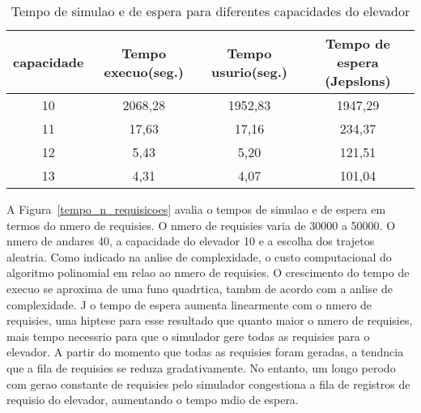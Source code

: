 \documentclass[12pt]{article}
\begin{document}
\begin{table}[ht!]
\centering
\begin{footnotesize}
\begin{tabular}{|c|c|c|c|}
\hline
\textbf{capacidade}              		& \textbf{Tempo execuo(seg.)} & \textbf{Tempo usurio(seg.)}      & \textbf{Tempo de espera (Jepslons)}\\ \hline
10	& 2068,28	& 1952,83	& 1947,29\\ \hline
11	& 17,63		& 17,16		& 234,37\\ \hline
12	& 5,43		& 5,20		& 121,51\\ \hline
13	& 4,31		& 4,07		& 101,04\\ \hline
\end{tabular}
\end{footnotesize}
\caption{Tempo de simulao e de espera para diferentes capacidades do elevador \label{tempo_capacidade_elevador}}
\end{table}

A Figura~\ref{tempo_n_requisicoes} avalia o tempos de simulao e de espera em termos do nmero de requisies. O nmero de requisies varia de 30000 a 50000. O nmero de andares  40, a capacidade do elevador  10 e a escolha dos trajetos  aleatria. Como indicado na anlise de complexidade, o custo computacional do algoritmo  polinomial em relao ao nmero de requisies. O crescimento do tempo de execuo se aproxima de uma funo quadrtica, tambm de acordo com a anlise de complexidade. J o tempo de espera aumenta linearmente com o nmero de requisies, uma hiptese para esse resultado  que quanto maior o nmero de requisies, mais tempo  necessrio para que o simulador gere todas as requisies para o elevador. A partir do momento que todas as requisies foram geradas, a tendncia  que a fila de requisies se reduza gradativamente. No entanto, um longo perodo com gerao constante de requisies pelo simulador congestiona a fila de registros de requisio do elevador, aumentando o tempo mdio de espera.

\end{document}
